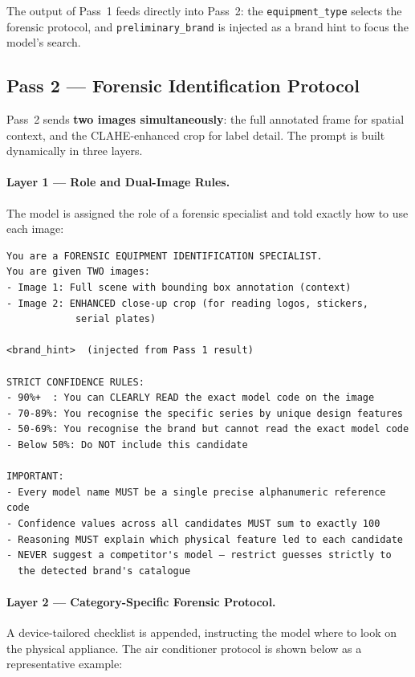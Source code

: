 The output of Pass~1 feeds directly into Pass~2: the \texttt{equipment\_type} selects the forensic protocol, and \texttt{preliminary\_brand} is injected as a brand hint to focus the model's search.

\subsection{Pass 2 — Forensic Identification Protocol}

Pass~2 sends \textbf{two images simultaneously}: the full annotated frame for spatial context, and the CLAHE-enhanced crop for label detail. The prompt is built dynamically in three layers.

\paragraph{Layer 1 — Role and Dual-Image Rules.} The model is assigned the role of a forensic specialist and told exactly how to use each image:

\begin{lstlisting}[language={}, caption={Pass 2 base prompt — role definition and dual-image instructions}, label={lst:pass2-base}]
You are a FORENSIC EQUIPMENT IDENTIFICATION SPECIALIST.
You are given TWO images:
- Image 1: Full scene with bounding box annotation (context)
- Image 2: ENHANCED close-up crop (for reading logos, stickers,
            serial plates)

<brand_hint>  (injected from Pass 1 result)

STRICT CONFIDENCE RULES:
- 90%+  : You can CLEARLY READ the exact model code on the image
- 70-89%: You recognise the specific series by unique design features
- 50-69%: You recognise the brand but cannot read the exact model code
- Below 50%: Do NOT include this candidate

IMPORTANT:
- Every model name MUST be a single precise alphanumeric reference code
- Confidence values across all candidates MUST sum to exactly 100
- Reasoning MUST explain which physical feature led to each candidate
- NEVER suggest a competitor's model — restrict guesses strictly to
  the detected brand's catalogue
\end{lstlisting}

\paragraph{Layer 2 — Category-Specific Forensic Protocol.} A device-tailored checklist is appended, instructing the model where to look on the physical appliance. The air conditioner protocol is shown below as a representative example:

